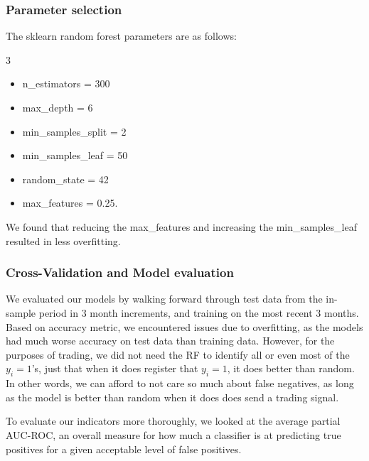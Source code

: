 \documentclass[10pt]{article}
\theoremstyle{definition}
\begin{document}
\subsubsection*{Parameter selection}

The sklearn random forest parameters are as follows:
\begin{multicols}{3}
\begin{itemize}
  \setlength\itemsep{0em}
    \item n\_estimators = 300
    \item max\_depth = 6
    \item min\_samples\_split = 2 
    \item min\_samples\_leaf = 50
    \item random\_state = 42
    \item max\_features = 0.25.
\end{itemize}
\end{multicols}
We found that reducing the max\_features and increasing the min\_samples\_leaf resulted in less overfitting.

\subsubsection*{Cross-Validation and Model evaluation} We evaluated our models by walking forward through test data from the in-sample period in 3 month increments, and training on the most recent 3 months. Based on accuracy metric, we encountered issues due to overfitting, as the models had much worse accuracy on test data than training data. However, for the purposes of trading, we did not need the RF to identify all or even most of the $y_i = 1$'s, just that when it does register that $y_i = 1$, it does better than random. In other words, we can afford to not care so much about false negatives, as long as the model is better than random when it does does send a trading signal.

To evaluate our indicators more thoroughly, we looked at the average partial AUC-ROC, an overall measure for how much a classifier is at predicting true positives for a given acceptable level of false positives. 
\end{document}
